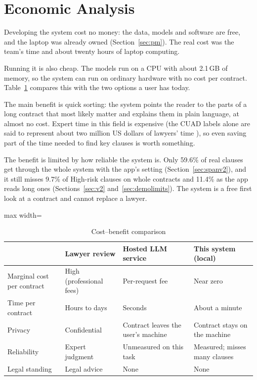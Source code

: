 \section{Economic Analysis}
Developing the system cost no money: the data, models and software are free, and the laptop was already owned (Section~\ref{sec:pm}). The real cost was the team's time and about twenty hours of laptop computing.

Running it is also cheap. The models run on a CPU with about 2.1\,GB of memory, so the system can run on ordinary hardware with no cost per contract. Table~\ref{tab:econ} compares this with the two options a user has today.

The main benefit is quick sorting: the system points the reader to the parts of a long contract that most likely matter and explains them in plain language, at almost no cost. Expert time in this field is expensive (the CUAD labels alone are said to represent about two million US dollars of lawyers' time \cite{hendrycks2021cuad}), so even saving part of the time needed to find key clauses is worth something.

The benefit is limited by how reliable the system is. Only 59.6\% of real clauses get through the whole system with the app's setting (Section~\ref{sec:spanv2}), and it still misses 9.7\% of High-risk clauses on whole contracts and 11.4\% as the app reads long ones (Sections~\ref{sec:v2} and~\ref{sec:demolimits}). The system is a free first look at a contract and cannot replace a lawyer.

\begin{table}[H]
\centering
\caption{Cost--benefit comparison}
\label{tab:econ}
\small
\begin{adjustbox}{max width=\textwidth}
\begin{tabular}{>{\raggedright\arraybackslash}p{3.0cm} >{\raggedright\arraybackslash}p{3.0cm} >{\raggedright\arraybackslash}p{3.4cm} >{\raggedright\arraybackslash}p{3.6cm}}
\toprule
 & \textbf{Lawyer review} & \textbf{Hosted LLM service} & \textbf{This system (local)}\\
\midrule
Marginal cost per contract & High (professional fees) & Per-request fee & Near zero\\
Time per contract & Hours to days & Seconds & About a minute\\
Privacy & Confidential & Contract leaves the user's machine & Contract stays on the machine\\
Reliability & Expert judgment & Unmeasured on this task & Measured; misses many clauses\\
Legal standing & Legal advice & None & None\\
\bottomrule
\end{tabular}
\end{adjustbox}
\end{table}

